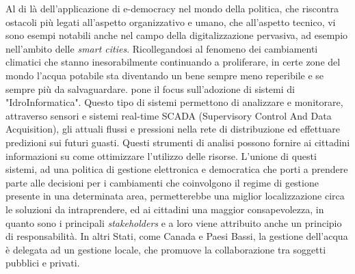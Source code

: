 \documentclass[12pt,a4paper,openright,twoside]{book}
\begin{document}
Al di là dell'applicazione di e-democracy nel mondo della politica, che riscontra
ostacoli più legati all'aspetto organizzativo e umano, che all'aspetto tecnico,
vi sono esempi notabili anche nel campo della digitalizzazione pervasiva, ad esempio nell'ambito delle \textit{smart cities}.
Ricollegandosi al fenomeno dei cambiamenti climatici che stanno inesorabilmente continuando a proliferare,
in certe zone del mondo l'acqua potabile sta diventando un bene sempre meno reperibile e se sempre più da salvaguardare.
\cite{smartwater} pone il focus sull'adozione di sistemi di "IdroInformatica". Questo tipo di sistemi permettono di analizzare 
e monitorare, attraverso sensori e sistemi real-time SCADA (Supervisory Control And Data Acquisition), gli attuali flussi e pressioni nella
rete di distribuzione ed effettuare predizioni sui futuri guasti. Questi strumenti di analisi possono fornire ai cittadini
informazioni su come ottimizzare l'utilizzo delle risorse. L'unione di questi sistemi, ad una politica di gestione elettronica e democratica
che porti a prendere parte alle decisioni per i cambiamenti che coinvolgono il regime di gestione presente in una determinata area,
permetterebbe una miglior localizzazione circa le soluzioni da intraprendere, ed ai cittadini una maggior consapevolezza, in quanto sono i principali \textit{stakeholders} 
e a loro viene attribuito anche un principio di responsabilità.
In altri Stati, come Canada e Paesi Bassi, la gestione dell'acqua è delegata ad un gestione locale, che promuove la collaborazione tra soggetti pubblici e privati.
\end{document}

